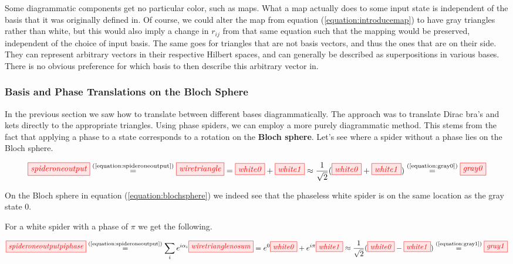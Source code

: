 \documentclass[]{article}
\newcommand{\equaltext}[1]{\ensuremath{\stackrel{\text{#1}}{=}}}
\begin{document}
Some diagrammatic components get no particular color, such as maps. What a map actually does to some input state is independent of the basis that it was originally defined in. Of course, we could alter the map from equation (\ref{equation:introducemap}) to have gray triangles rather than white, but this would also imply a change in $r_{ij}$ from that same equation such that the mapping would be preserved, independent of the choice of input basis. The same goes for triangles that are not basis vectors, and thus the ones that are on their side. They can represent arbitrary vectors in their respective Hilbert spaces, and can generally be described as superpositions in various bases. There is no obvious preference for which basis to then describe this arbitrary vector in.


\subsubsection{Basis and Phase Translations on the Bloch Sphere}
\label{section:basisandphasetranslations}
In the previous section we saw how to translate between different bases diagrammatically. The approach was to translate Dirac bra's and kets directly to the appropriate triangles. Using phase spiders, we can employ a more purely diagrammatic method. This stems from the fact that applying a phase to a state corresponds to a rotation on the \textbf{Bloch sphere}. Let's see where a spider without a phase lies on the Bloch sphere.

\begin{equation}
\tikzfig{spideroneoutput} \equaltext{(\ref{equation:spideroneoutput})} \tikzfig{wiretriangle} = \tikzfig{white0} + \tikzfig{white1} \approx \frac{1}{\sqrt{2}}(\tikzfig{white0} + \tikzfig{white1}) \equaltext{(\ref{equation:gray0})} \tikzfig{gray0}
\end{equation}

On the Bloch sphere in equation (\ref{equation:blochsphere}) we indeed see that the phaseless white spider is on the same location as the gray state 0.

For a white spider with a phase of $\pi$ we get the following.

\begin{equation}
\tikzfig{spideroneoutputpiphase} \equaltext{(\ref{equation:spideroneoutput})} \sum\limits_{i} e^{i\alpha_i}\tikzfig{wiretrianglenosum} = e^{0}\tikzfig{white0} + e^{i\pi}\tikzfig{white1} \approx \frac{1}{\sqrt{2}}(\tikzfig{white0} - \tikzfig{white1}) \equaltext{(\ref{equation:gray1})} \tikzfig{gray1}
\end{equation}
\end{document}
